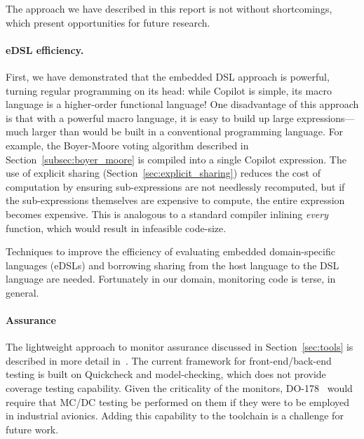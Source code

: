 The approach we have described in this report is not without shortcomings, which
present opportunities for future research.

\paragraph{eDSL efficiency.}
First, we have demonstrated that the embedded DSL approach is powerful,
turning regular programming on its head: while Copilot is simple, its
macro language is a higher-order functional language!  One disadvantage of this
approach is that with a powerful macro language, it is easy to
build up large expressions---much larger than would be built in a
conventional programming language.  For example, the Boyer-Moore
voting algorithm described in Section~\ref{subsec:boyer_moore} is compiled into
a single Copilot expression.  The use of explicit sharing
(Section~\ref{sec:explicit_sharing}) reduces the cost of computation by ensuring
sub-expressions are not needlessly recomputed, but if the sub-expressions
themselves are expensive to compute, the entire expression becomes expensive.
This is analogous to a standard compiler inlining \emph{every} function, which
would result in infeasible code-size.  

Techniques to improve the efficiency of evaluating embedded domain-specific
languages (eDSLs) and borrowing sharing
from the host language to the DSL language are needed.  Fortunately in our
domain, monitoring code is terse, in general.

\paragraph{Assurance}
The lightweight approach to monitor assurance discussed in
Section~\ref{sec:tools} is described in more detail
in~\cite{PikeWNG2012}.  The current framework for front-end/back-end
testing is built on Quickcheck and model-checking, which does not provide coverage
testing capability.  Given the criticality of the monitors,
DO-178~\cite{DO178B} would require that MC/DC testing be performed on
them if they were to be employed in industrial avionics. Adding this
capability to the toolchain is a challenge for future work.


